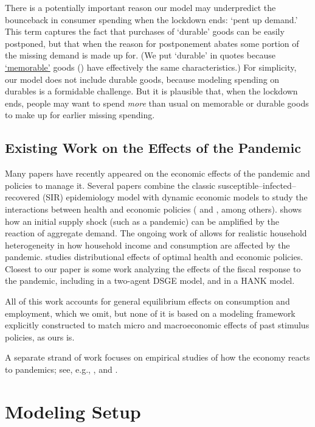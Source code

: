 \documentclass[titlepage,a4paper]{\econtex}
\begin{document}
There is a potentially important reason our model may underpredict the bounceback in consumer spending when the lockdown ends: `pent up demand.'  This term captures the fact that purchases of `durable' goods can be easily postponed, but that when the reason for postponement abates some portion of the missing demand is made up for.  (We put `durable' in quotes because \href{https://www.nber.org/papers/w19386}{`memorable'} goods (\cite{hkpMemory}) have effectively the same characteristics.) For simplicity, our model does not include durable goods, because modeling spending on durables is a formidable challenge.  But it is plausible that, when the lockdown ends, people may want to spend \textit{more} than usual on memorable or durable goods to make up for earlier missing spending.

\subsection*{Existing Work on the Effects of the Pandemic}

Many papers have recently appeared on the economic effects of the pandemic and policies to manage it.
Several papers combine the classic susceptible--infected--recovered (SIR) epidemiology model with dynamic economic models to study the interactions between health and economic policies (\cite{ert_covid} and \cite{aal_covid}, among others).
\cite{covidMacroImpl} shows how an initial supply shock (such as a pandemic) can be amplified by the reaction of aggregate demand.
The ongoing work of \cite{kmv_pandemics} allows for realistic household heterogeneity in how household income and consumption are affected by the pandemic.
\cite{healthWealth} studies distributional effects of optimal health and economic policies.
Closest to our paper is some work analyzing the effects of the fiscal response to the pandemic, including \cite{faria_FPpandemic} in a two-agent DSGE model, and \cite{bayer_corona} in a HANK model.

All of this work accounts for general equilibrium effects on consumption and employment, which we omit, but none of it is based on a modeling framework explicitly constructed to match micro and macroeconomic effects of past stimulus policies, as ours is.

A separate strand of work focuses on empirical studies of how the economy reacts to pandemics; see, e.g., \cite{baker_Cpandemic}, \cite{jorda_pandemics} and \cite{verner_pandemics}.

\section{Modeling Setup}
\end{document}
